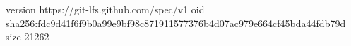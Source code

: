 version https://git-lfs.github.com/spec/v1
oid sha256:fdc9d41f6f9b0a99e9bf98c871911577376b4d07ac979e664cf45bda44fdb79d
size 21262
